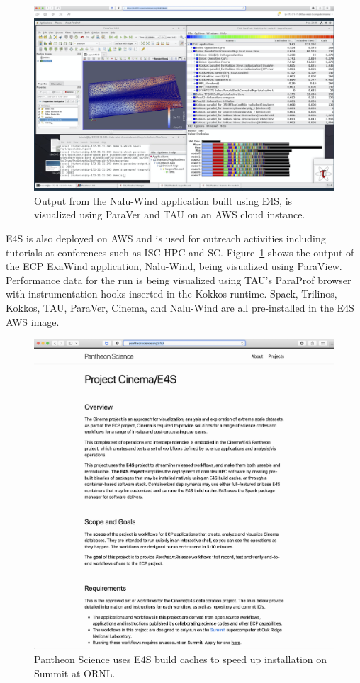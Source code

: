 \begin{figure}
        \centering
        \includegraphics[width=0.9\linewidth]{projects/2.3.5-Ecosystem/2.3.5.01-Ecosystem-SDK/E4S_Nalu_AWS}
        \caption{Output from the Nalu-Wind application built using E4S, is visualized using ParaVer and TAU on an AWS cloud instance.}
        \label{fig:E4SImageOnAWS}
\end{figure}

E4S is also deployed on AWS and is used for outreach activities including tutorials at conferences such as ISC-HPC and SC. Figure~\ref{fig:E4SImageOnAWS} shows the output of the ECP ExaWind application, Nalu-Wind, being visualized using ParaView. Performance data for the run is being visualized using TAU's ParaProf browser with instrumentation hooks inserted in the Kokkos runtime. Spack, Trilinos, Kokkos, TAU, ParaVer, Cinema, and Nalu-Wind are all pre-installed in the E4S AWS image. 

\begin{figure}
        \centering
        \includegraphics[width=0.9\linewidth]{projects/2.3.5-Ecosystem/2.3.5.01-Ecosystem-SDK/E4S_Pantheon}
        \caption{Pantheon Science uses E4S build caches to speed up installation on Summit at ORNL.}
        \label{fig:PantheonE4S}
\end{figure}

